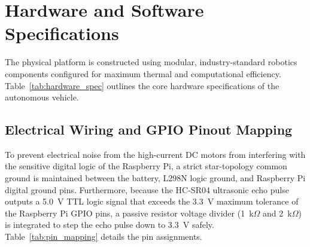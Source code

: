 \section{Hardware and Software Specifications}
The physical platform is constructed using modular, industry-standard robotics components configured for maximum thermal and computational efficiency. Table~\ref{tab:hardware_spec} outlines the core hardware specifications of the autonomous vehicle.

\begin{table}[H]
\caption{System Hardware and Sensor Specifications}
\label{tab:hardware_spec}
\begin{center}
\end{center}
\end{table}

\subsection{Electrical Wiring and GPIO Pinout Mapping}
To prevent electrical noise from the high-current DC motors from interfering with the sensitive digital logic of the Raspberry Pi, a strict star-topology common ground is maintained between the battery, L298N logic ground, and Raspberry Pi digital ground pins. Furthermore, because the HC-SR04 ultrasonic echo pulse outputs a 5.0~V TTL logic signal that exceeds the 3.3~V maximum tolerance of the Raspberry Pi GPIO pins, a passive resistor voltage divider (1~k$\Omega$ and 2~k$\Omega$) is integrated to step the echo pulse down to 3.3~V safely. Table~\ref{tab:pin_mapping} details the pin assignments.

